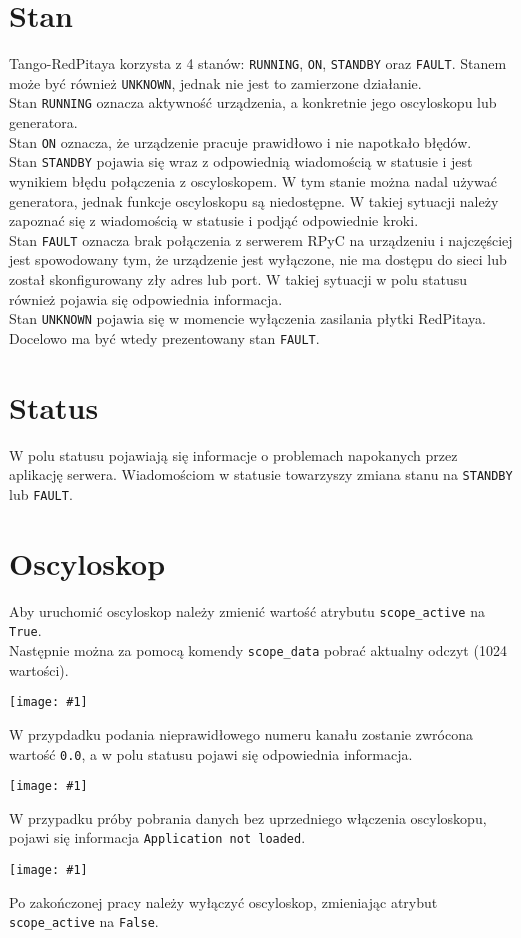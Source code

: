 \documentclass[12pt,a4paper]{article}
\newcommand{\screenshot}[1]{\begin{minipage}[c]{\textwidth}\texttt{[image: \#1]}\end{minipage}}
\begin{document}
	\section{Stan}
	Tango-RedPitaya korzysta z 4 stanów: \texttt{RUNNING}, \texttt{ON}, \texttt{STANDBY} oraz \texttt{FAULT}.
	Stanem może być również \texttt{UNKNOWN}, jednak nie jest to zamierzone działanie.\\
	Stan \texttt{RUNNING} oznacza aktywność urządzenia, a konkretnie jego oscyloskopu lub generatora.\\
	Stan \texttt{ON} oznacza, że urządzenie pracuje prawidłowo i nie napotkało błędów.\\
	Stan \texttt{STANDBY} pojawia się wraz z odpowiednią wiadomością w statusie i jest wynikiem błędu połączenia z oscyloskopem.
	W tym stanie można nadal używać generatora, jednak funkcje oscyloskopu są niedostępne. W takiej sytuacji należy zapoznać się z wiadomością w statusie i podjąć odpowiednie kroki.\\
	Stan \texttt{FAULT} oznacza brak połączenia z serwerem RPyC na urządzeniu i najczęściej jest spowodowany tym, że urządzenie jest wyłączone, nie ma dostępu do sieci lub został skonfigurowany zły adres lub port. W takiej sytuacji w polu statusu również pojawia się odpowiednia informacja.\\
	Stan \texttt{UNKNOWN} pojawia się w momencie wyłączenia zasilania płytki RedPitaya. Docelowo ma być wtedy prezentowany stan \texttt{FAULT}.

	\section{Status}
	W polu statusu pojawiają się informacje o problemach napokanych przez aplikację serwera. Wiadomościom w statusie towarzyszy zmiana stanu na \texttt{STANDBY} lub \texttt{FAULT}.\\

	\section{Oscyloskop}
	Aby uruchomić oscyloskop należy zmienić wartość atrybutu \texttt{scope\_active} na \texttt{True}.\\
	Następnie można za pomocą komendy \texttt{scope\_data} pobrać aktualny odczyt (1024 wartości).\\
	\screenshot{screenshots/scope_data.png}
	W przypdadku podania nieprawidłowego numeru kanału zostanie zwrócona wartość \texttt{0.0}, a w polu statusu pojawi się odpowiednia informacja.\\
	\screenshot{screenshots/invalid_scope_channel.png}
	W przypadku próby pobrania danych bez uprzedniego włączenia oscyloskopu, pojawi się informacja \texttt{Application not loaded}.\\
	\screenshot{screenshots/scope_inactive.png}
	Po zakończonej pracy należy wyłączyć oscyloskop, zmieniając atrybut \texttt{scope\_active} na \texttt{False}.
\end{document}

